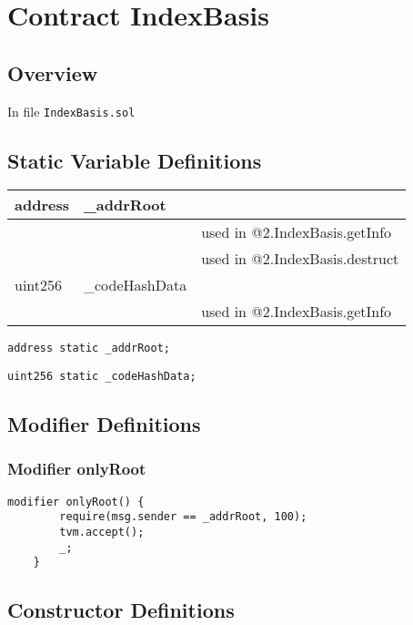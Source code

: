 
\chapter{Contract IndexBasis}

\minitoc

\section{Overview}


In file {\tt IndexBasis.sol}

\section{Static Variable Definitions}


\ifsoltables
\noindent\begin{tabular}{|l|l|p{5cm}|}\hline
address & \_{}addrRoot &  \\\hline
 & & used in @2.IndexBasis.getInfo\\\hline
 & & used in @2.IndexBasis.destruct\\\hline
uint256 & \_{}codeHashData &  \\\hline
 & & used in @2.IndexBasis.getInfo\\\hline
\end{tabular}
\fi


\begin{lstlisting}[firstnumber=7]
    address static _addrRoot;
\end{lstlisting}

\begin{lstlisting}[firstnumber=8]
    uint256 static _codeHashData;
\end{lstlisting}

\section{Modifier Definitions}


\subsection{Modifier onlyRoot}


\begin{lstlisting}[firstnumber=10]
    modifier onlyRoot() {
        require(msg.sender == _addrRoot, 100);
        tvm.accept();
        _;
    }
\end{lstlisting}

\section{Constructor Definitions}


